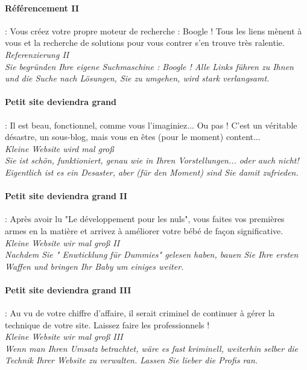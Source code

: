 \documentclass[10pt,a4paper]{article}
\begin{document}
\paragraph{Référencement II} : Vous créez votre propre moteur de recherche : Boogle ! Tous les liens mènent à vous et la recherche de solutions pour vous contrer s'en trouve très ralentie.\\
\textit{Referenzierung II}\\
\textit{Sie begründen Ihre eigene Suchmaschine : Boogle ! Alle Links führen zu Ihnen und die Suche nach Lösungen, Sie zu umgehen, wird stark verlangsamt.}


\paragraph{Petit site deviendra grand }: Il est beau, fonctionnel, comme vous l'imaginiez... Ou pas ! C'est un véritable désastre, un sous-blog, mais vous en êtes (pour le moment) content...\\
\textit{Kleine Website wird mal groß}\\
\textit{Sie ist schön, funktioniert, genau wie in Ihren Vorstellungen... oder auch nicht! Eigentlich ist es ein Desaster, aber (für den Moment) sind Sie damit zufrieden.}


\paragraph{Petit site deviendra grand II} : Après avoir lu "Le développement pour les nuls", vous faites vos premières armes en la matière et arrivez à améliorer votre bébé de façon significative.\\
\textit{Kleine Website wir mal groß II}\\
\textit{Nachdem Sie " Enwticklung für Dummies" gelesen haben, bauen Sie Ihre ersten Waffen und bringen Ihr Baby um einiges weiter.}


\paragraph{Petit site deviendra grand III} : Au vu de votre chiffre d'affaire, il serait criminel de continuer à gérer la technique de votre site. Laissez faire les professionnels !\\
\textit{Kleine Website wir mal groß III}\\
\textit{Wenn man Ihren Umsatz betrachtet, wäre es fast kriminell, weiterhin selber die Technik Ihrer Website zu verwalten. Lassen Sie lieber die Profis ran.}
\end{document}
